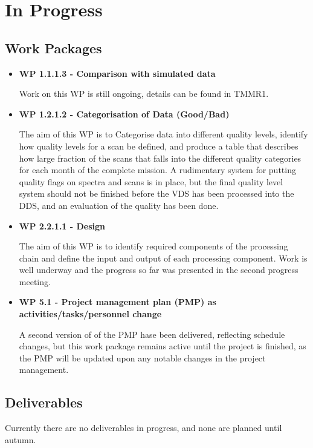 \chapter{In Progress}
\label{chapter:in_progress}



\section{Work Packages}

\begin{itemize}

\item{\bf WP 1.1.1.3 - Comparison with simulated data}

Work on this WP is still ongoing, details can be found in TMMR1.


\item{\bf WP 1.2.1.2 - Categorisation of Data (Good/Bad)}

The aim of this WP is to Categorise data into different quality levels, identify how quality levels for a scan be defined, and produce a table that describes how large fraction of the scans that falls into the different quality categories for each month of the complete mission. A rudimentary system for putting quality flags on spectra and scans is in place, but the final quality level system should not be finished before the VDS has been processed into the DDS, and an evaluation of the quality has been done.   


\item{\bf WP 2.2.1.1 - Design}

The aim of this WP is to identify required components of the processing chain and define the input and output of each processing component. Work is well underway and the progress so far was presented in the second progress meeting. 


\item{\bf WP 5.1 - Project management plan (PMP) as activities/tasks/personnel change}

A second version of of the PMP hase been delivered, reflecting schedule changes, but this work package remains active until the project is finished, as the PMP will be updated upon any notable
changes in the project management.


\end{itemize}


\section{Deliverables}

Currently there are no deliverables in progress, and none are planned until autumn.